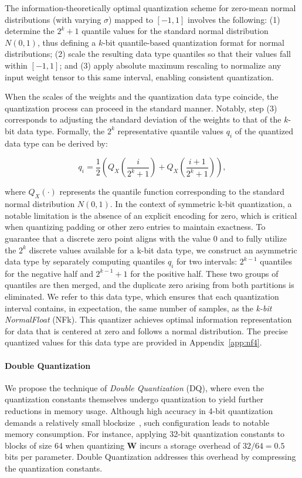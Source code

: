 The information-theoretically optimal quantization scheme for zero-mean normal distributions (with varying $\sigma$) mapped to $[-1, 1]$ involves the following: (1) determine the $2^k + 1$ quantile values for the standard normal distribution $N(0, 1)$, thus defining a $k$-bit quantile-based quantization format for normal distributions; (2) scale the resulting data type quantiles so that their values fall within $[-1, 1]$; and (3) apply absolute maximum rescaling to normalize any input weight tensor to this same interval, enabling consistent quantization.

When the scales of the weights and the quantization data type coincide, the quantization process can proceed in the standard manner. Notably, step (3) corresponds to adjusting the standard deviation of the weights to that of the $k$-bit data type. Formally, the $2^k$ representative quantile values $q_i$ of the quantized data type can be derived by:

\begin{equation}
q_i  = \frac{1}{2}\left( Q_X\left(\frac{i}{2^k+1}\right) + Q_X\left(\frac{i+1}{2^k+1}\right)\right),
\end{equation}

where $Q_X(\cdot)$ represents the quantile function corresponding to the standard normal distribution $N(0,1)$. In the context of symmetric k-bit quantization, a notable limitation is the absence of an explicit encoding for zero, which is critical when quantizing padding or other zero entries to maintain exactness. To guarantee that a discrete zero point aligns with the value $0$ and to fully utilize the $2^k$ discrete values available for a k-bit data type, we construct an asymmetric data type by separately computing quantiles $q_i$ for two intervals: $2^{k-1}$ quantiles for the negative half and $2^{k-1}+1$ for the positive half. These two groups of quantiles are then merged, and the duplicate zero arising from both partitions is eliminated. We refer to this data type, which ensures that each quantization interval contains, in expectation, the same number of samples, as the \emph{k-bit NormalFloat} (NFk). This quantizer achieves optimal information representation for data that is centered at zero and follows a normal distribution. The precise quantized values for this data type are provided in Appendix~\ref{app:nf4}.

\paragraph{Double Quantization{}} 
We propose the technique of \emph{Double Quantization} (DQ), where even the quantization constants themselves undergo quantization to yield further reductions in memory usage. Although high accuracy in 4-bit quantization demands a relatively small blocksize~\citep{dettmers2022case}, such configuration leads to notable memory consumption. For instance, applying 32-bit quantization constants to blocks of size 64 when quantizing $\mathbf{W}$ incurs a storage overhead of $32/64 = 0.5$ bits per parameter. Double Quantization addresses this overhead by compressing the quantization constants.

